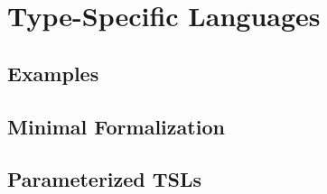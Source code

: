 \chapter{Type-Specific Languages}\label{chap:tsls}
\section{Examples}\label{sec:tsls-examples}
\section{Minimal Formalization}\label{sec:tsls-minimal-formalization}
\section{Parameterized TSLs}\label{sec:tsls-parameterized}

